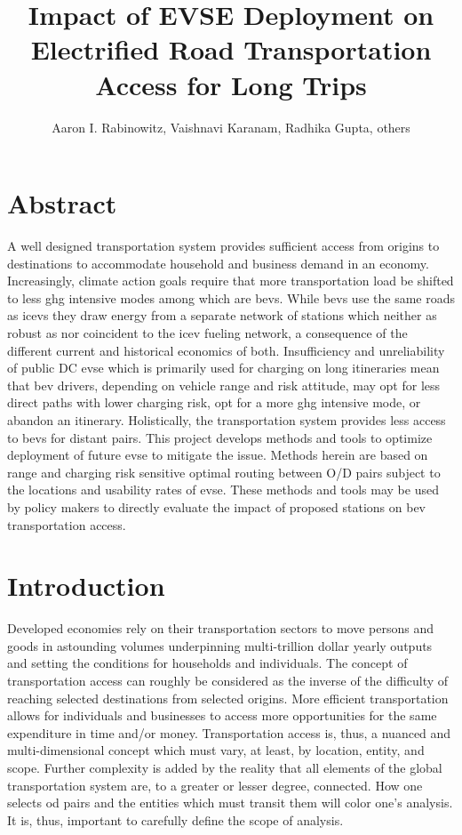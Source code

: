 \documentclass[12pt]{article}
\title{Impact of EVSE Deployment on Electrified Road Transportation Access for Long Trips}
\author{Aaron I. Rabinowitz, Vaishnavi Karanam, Radhika Gupta, others}
\date{}
\begin{document}
\maketitle

\section*{Abstract}

A well designed transportation system provides sufficient access from origins to destinations to accommodate household and business demand in an economy.  Increasingly, climate action goals require that more transportation load be shifted to less \gls{ghg} intensive modes among which are \glspl{bev}. While \glspl{bev} use the same roads as \glspl{icev} they draw energy from a separate network of stations which neither as robust as nor coincident to the \gls{icev} fueling network, a consequence of the different current and historical economics of both. Insufficiency and unreliability of public DC \gls{evse} which is primarily used for charging on long itineraries mean that \gls{bev} drivers, depending on vehicle range and risk attitude, may opt for less direct paths with lower charging risk, opt for a more \gls{ghg} intensive mode, or abandon an itinerary. Holistically, the transportation system provides less access to \glspl{bev} for distant pairs. This project develops methods and tools to optimize deployment of future \gls{evse} to mitigate the issue. Methods herein are based on range and charging risk sensitive optimal routing between O/D pairs subject to the locations and usability rates of \gls{evse}. These methods and tools may be used by policy makers to directly evaluate the impact of proposed stations on \gls{bev} transportation access.

\section*{Introduction}

Developed economies rely on their transportation sectors to move persons and goods in astounding volumes underpinning multi-trillion dollar yearly outputs and setting the conditions for households and individuals. The concept of transportation access can roughly be considered as the inverse of the difficulty of reaching selected destinations from selected origins. More efficient transportation allows for individuals and businesses to access more opportunities for the same expenditure in time and/or money. Transportation access is, thus, a nuanced and multi-dimensional concept which must vary, at least, by location, entity, and scope. Further complexity is added by the reality that all elements of the global transportation system are, to a greater or lesser degree, connected. How one selects \gls{od} pairs and the entities which must transit them will color one's analysis. It is, thus, important to carefully define the scope of analysis.
\end{document}
